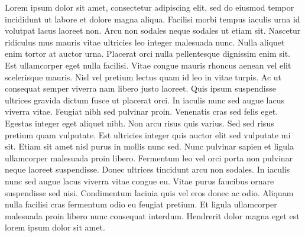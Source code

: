 Lorem ipsum dolor sit amet, consectetur adipiscing elit, sed do eiusmod tempor incididunt ut labore et dolore magna aliqua. Facilisi morbi tempus iaculis urna id volutpat lacus laoreet non. Arcu non sodales neque sodales ut etiam sit. Nascetur ridiculus mus mauris vitae ultricies leo integer malesuada nunc. Nulla aliquet enim tortor at auctor urna. Placerat orci nulla pellentesque dignissim enim sit. Est ullamcorper eget nulla facilisi. Vitae congue mauris rhoncus aenean vel elit scelerisque mauris. Nisl vel pretium lectus quam id leo in vitae turpis. Ac ut consequat semper viverra nam libero justo laoreet. Quis ipsum suspendisse ultrices gravida dictum fusce ut placerat orci. In iaculis nunc sed augue lacus viverra vitae. Feugiat nibh sed pulvinar proin. Venenatis cras sed felis eget. Egestas integer eget aliquet nibh. Non arcu risus quis varius. Sed sed risus pretium quam vulputate.
Est ultricies integer quis auctor elit sed vulputate mi sit. Etiam sit amet nisl purus in mollis nunc sed. Nunc pulvinar sapien et ligula ullamcorper malesuada proin libero. Fermentum leo vel orci porta non pulvinar neque laoreet suspendisse. Donec ultrices tincidunt arcu non sodales. In iaculis nunc sed augue lacus viverra vitae congue eu. Vitae purus faucibus ornare suspendisse sed nisi. Condimentum lacinia quis vel eros donec ac odio. Aliquam nulla facilisi cras fermentum odio eu feugiat pretium. Et ligula ullamcorper malesuada proin libero nunc consequat interdum. Hendrerit dolor magna eget est lorem ipsum dolor sit amet. 


